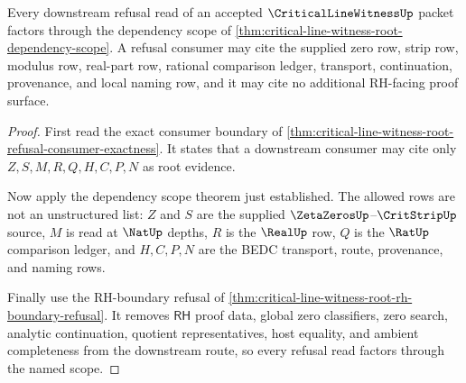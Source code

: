 \begin{theorem}
\label{thm:critical-line-witness-downstream-refusal-factorization}
Every downstream refusal read of an accepted $\CriticalLineWitnessUp$ packet
factors through the dependency scope of
\autoref{thm:critical-line-witness-root-dependency-scope}. A refusal consumer
may cite the supplied zero row, strip row, modulus row, real-part row, rational
comparison ledger, transport, continuation, provenance, and local naming row,
and it may cite no additional RH-facing proof surface.
\end{theorem}
\begin{proof}
First read the exact consumer boundary of
\autoref{thm:critical-line-witness-root-refusal-consumer-exactness}. It states
that a downstream consumer may cite only $Z,S,M,R,Q,H,C,P,N$ as root evidence.

Now apply the dependency scope theorem just established. The allowed rows are
not an unstructured list: $Z$ and $S$ are the supplied
$\ZetaZerosUp$--$\CritStripUp$ source, $M$ is read at $\NatUp$ depths, $R$ is
the $\RealUp$ row, $Q$ is the $\RatUp$ comparison ledger, and $H,C,P,N$ are the
BEDC transport, route, provenance, and naming rows.

Finally use the RH-boundary refusal of
\autoref{thm:critical-line-witness-root-rh-boundary-refusal}. It removes
$\mathsf{RH}$ proof data, global zero classifiers, zero search, analytic
continuation, quotient representatives, host equality, and ambient completeness
from the downstream route, so every refusal read factors through the named
scope.
\end{proof}

